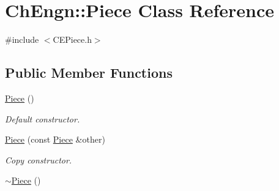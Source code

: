 \hypertarget{classChEngn_1_1Piece}{
\section{ChEngn::Piece Class Reference}
\label{classChEngn_1_1Piece}
}


{\ttfamily \#include $<$CEPiece.h$>$}

\subsection*{Public Member Functions}
\begin{DoxyCompactItemize}
\item 
\hyperlink{classChEngn_1_1Piece_abe7c3a8a7e5ed3beb583a6f6b4df2531}{Piece} ()
\begin{DoxyCompactList}\small\item\em Default constructor. \item\end{DoxyCompactList}\item 
\hyperlink{classChEngn_1_1Piece_a5abff07a09fc78b6fc805cde2a298b41}{Piece} (const \hyperlink{classChEngn_1_1Piece}{Piece} \&other)
\begin{DoxyCompactList}\small\item\em Copy constructor. \item\end{DoxyCompactList}\item 
\hypertarget{classChEngn_1_1Piece_a75360762004389b1df624136bcaff309}{
\hyperlink{classChEngn_1_1Piece_a75360762004389b1df624136bcaff309}{$\sim$Piece} ()}
\label{classChEngn_1_1Piece_a75360762004389b1df624136bcaff309}


\end{DoxyCompactItemize}
